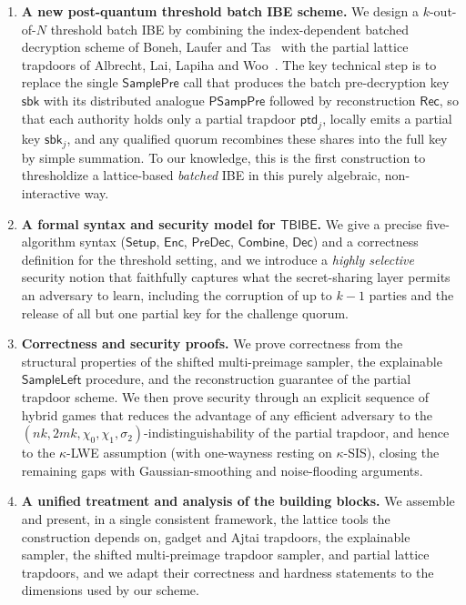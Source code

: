 \begin{enumerate}
    \item \textbf{A new post-quantum threshold batch IBE scheme.}
    We design a $k$-out-of-$N$ threshold batch IBE by combining the index-dependent
    batched decryption scheme of Boneh, Laufer and Tas~\cite{EPRINT:BonLauTas25}
    with the partial lattice trapdoors of Albrecht, Lai, Lapiha and
    Woo~\cite{AC:ALLW25}. The key technical step is to replace the single
    $\mathsf{SamplePre}$ call that produces the batch pre-decryption key
    $\mathsf{sbk}$ with its distributed analogue $\mathsf{PSampPre}$ followed by
    reconstruction $\mathsf{Rec}$, so that each authority holds only a partial
    trapdoor $\mathsf{ptd}_j$, locally emits a partial key $\mathsf{sbk}_j$, and any
    qualified quorum recombines these shares into the full key by simple summation.
    To our knowledge, this is the first construction to thresholdize a lattice-based
    \emph{batched} IBE in this purely algebraic, non-interactive way.
 
    \item \textbf{A formal syntax and security model for $\mathsf{TBIBE}$.}
    We give a precise five-algorithm syntax
    ($\mathsf{Setup}$, $\mathsf{Enc}$, $\mathsf{PreDec}$, $\mathsf{Combine}$,
    $\mathsf{Dec}$) and a correctness definition for the threshold setting, and we
    introduce a \emph{highly selective} security notion that faithfully captures
    what the secret-sharing layer permits an adversary to learn, including the
    corruption of up to $k-1$ parties and the release of all but one partial key
    for the challenge quorum.
 
    \item \textbf{Correctness and security proofs.}
    We prove correctness from the structural properties of the shifted
    multi-preimage sampler, the explainable $\mathsf{SampleLeft}$ procedure, and the
    reconstruction guarantee of the partial trapdoor scheme. We then prove security
    through an explicit sequence of hybrid games that reduces the advantage of any
    efficient adversary to the
    $(nk, 2mk, \chi_0, \chi_1, \sigma_2)$-indistinguishability of the partial
    trapdoor, and hence to the $\kappa$-LWE assumption (with one-wayness resting on
    $\kappa$-SIS), closing the remaining gaps with Gaussian-smoothing and
    noise-flooding arguments.
 
    \item \textbf{A unified treatment and analysis of the building blocks.}
    We assemble and present, in a single consistent framework, the lattice
    tools the construction depends on, gadget and Ajtai trapdoors, the explainable
    sampler, the shifted multi-preimage trapdoor sampler, and partial lattice
    trapdoors, and we adapt their correctness and hardness statements to the
    dimensions used by our scheme.
 

\end{enumerate}
